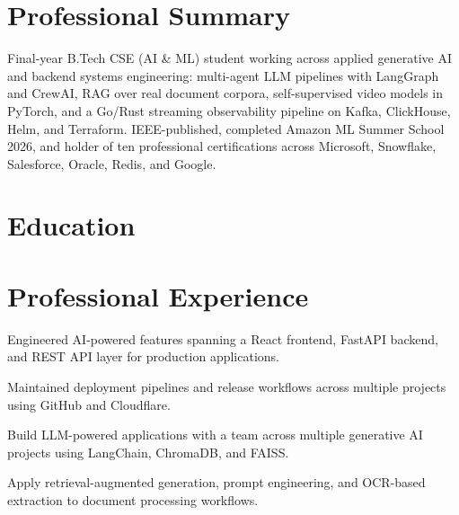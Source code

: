 \documentclass[a4paper,10pt]{article}
\begin{document}

\section{Professional Summary}
{\small
Final-year B.Tech CSE (AI \& ML) student working across applied generative AI and backend systems engineering: multi-agent LLM pipelines
with LangGraph and CrewAI, RAG over real document corpora, self-supervised video models in PyTorch, and a Go/Rust streaming observability
pipeline on Kafka, ClickHouse, Helm, and Terraform. IEEE-published, completed Amazon ML Summer School 2026, and holder of ten
professional certifications across Microsoft, Snowflake, Salesforce, Oracle, Redis, and Google.}

\section{Education}

\gap
\eduschool

\section{Professional Experience}

\begin{points}
  \item Engineered AI-powered features spanning a React frontend, FastAPI backend, and REST API layer for production applications.
  \item Maintained deployment pipelines and release workflows across multiple projects using GitHub and Cloudflare.
\end{points}
\gap

\begin{points}
  \item Build LLM-powered applications with a team across multiple generative AI projects using LangChain, ChromaDB, and FAISS.
  \item Apply retrieval-augmented generation, prompt engineering, and OCR-based extraction to document processing workflows.
\end{points}
\gap
\end{document}

